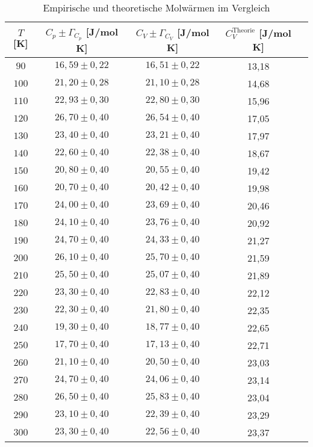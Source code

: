 \begin{table}[H]
  \centering
  \begin{tabular}{ccccc}
    \toprule
    $T$ [K] & $C_p \pm \Gamma_{C_p} $ [J/mol K]
    & $C_V \pm \Gamma_{C_V} $ [J/mol K] & $C_{V}^{\text{Theorie}}$ [J/mol K] \\
    \midrule
    $ 90$ & $16,59 \pm 0,22$ & $16,51 \pm 0,22$ & 13,18 \\
    $100$ & $21,20 \pm 0,28$ & $21,10 \pm 0,28$ & 14,68 \\
    $110$ & $22,93 \pm 0,30$ & $22,80 \pm 0,30$ & 15,96 \\
    $120$ & $26,70 \pm 0,40$ & $26,54 \pm 0,40$ & 17,05 \\
    $130$ & $23,40 \pm 0,40$ & $23,21 \pm 0,40$ & 17,97 \\
    $140$ & $22,60 \pm 0,40$ & $22,38 \pm 0,40$ & 18,67 \\
    $150$ & $20,80 \pm 0,40$ & $20,55 \pm 0,40$ & 19,42 \\
    $160$ & $20,70 \pm 0,40$ & $20,42 \pm 0,40$ & 19,98 \\
    $170$ & $24,00 \pm 0,40$ & $23,69 \pm 0,40$ & 20,46 \\
    $180$ & $24,10 \pm 0,40$ & $23,76 \pm 0,40$ & 20,92 \\
    $190$ & $24,70 \pm 0,40$ & $24,33 \pm 0,40$ & 21,27 \\
    $200$ & $26,10 \pm 0,40$ & $25,70 \pm 0,40$ & 21,59 \\
    $210$ & $25,50 \pm 0,40$ & $25,07 \pm 0,40$ & 21,89 \\
    $220$ & $23,30 \pm 0,40$ & $22,83 \pm 0,40$ & 22,12 \\
    $230$ & $22,30 \pm 0,40$ & $21,80 \pm 0,40$ & 22,35 \\
    $240$ & $19,30 \pm 0,40$ & $18,77 \pm 0,40$ & 22,65 \\
    $250$ & $17,70 \pm 0,40$ & $17,13 \pm 0,40$ & 22,71 \\
    $260$ & $21,10 \pm 0,40$ & $20,50 \pm 0,40$ & 23,03 \\
    $270$ & $24,70 \pm 0,40$ & $24,06 \pm 0,40$ & 23,14 \\
    $280$ & $26,50 \pm 0,40$ & $25,83 \pm 0,40$ & 23,04 \\
    $290$ & $23,10 \pm 0,40$ & $22,39 \pm 0,40$ & 23,29 \\
    $300$ & $23,30 \pm 0,40$ & $22,56 \pm 0,40$ & 23,37 \\
    \bottomrule
  \end{tabular}
  \caption{Empirische und theoretische Molwärmen im Vergleich}
  \label{tab:2}
\end{table}

